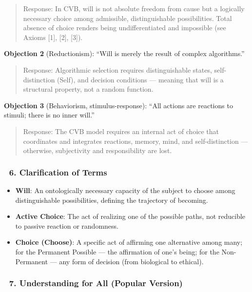 \documentclass[12pt]{article}
\begin{document}
\begin{quote}
Response: In CVB, will is not absolute freedom from cause but a logically necessary choice among admissible, distinguishable possibilities. Total absence of choice renders being undifferentiated and impossible (see Axioms [1], [2], [3]).
\end{quote}

\textbf{Objection 2} (Reductionism): ``Will is merely the result of complex algorithms.''

\begin{quote}
Response: Algorithmic selection requires distinguishable states, self-distinction (Self), and decision conditions — meaning that will is a structural property, not a random function.
\end{quote}

\textbf{Objection 3} (Behaviorism, stimulus-response): ``All actions are reactions to stimuli; there is no inner will.''

\begin{quote}
Response: The CVB model requires an internal act of choice that coordinates and integrates reactions, memory, mind, and self-distinction — otherwise, subjectivity and responsibility are lost.
\end{quote}

\subsubsection*{🔹 6. Clarification of Terms}

\begin{itemize}
\item \textbf{Will}: An ontologically necessary capacity of the subject to choose among distinguishable possibilities, defining the trajectory of becoming.
\item \textbf{Active Choice}: The act of realizing one of the possible paths, not reducible to passive reaction or randomness.
\item \textbf{Choice (Choose)}: A specific act of affirming one alternative among many; for the Permanent Possible — the affirmation of one’s being; for the Non-Permanent — any form of decision (from biological to ethical).
\end{itemize}

\subsubsection*{🔹 7. Understanding for All (Popular Version)}
\end{document}
